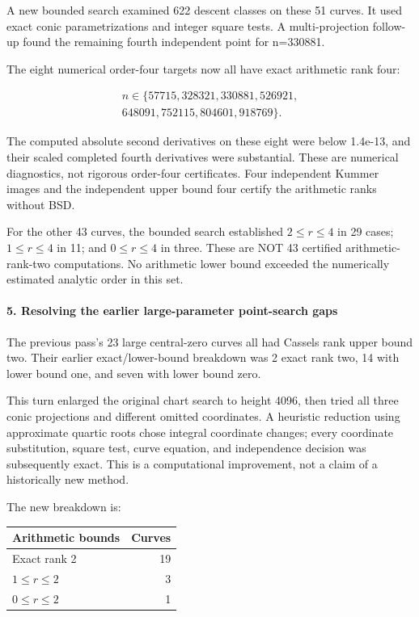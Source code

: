 \documentclass[11pt]{article}
\begin{document}
A new bounded search examined 622 descent classes on these 51 curves. It used exact conic parametrizations and integer square tests. A multi-projection follow-up found the remaining fourth independent point for n=330881.

The eight numerical order-four targets now all have exact arithmetic rank four:

\[
\begin{gathered}
 n\in\{57715,328321,330881,526921,\\
 648091,752115,804601,918769\}.
\end{gathered}
\]

The computed absolute second derivatives on these eight were below 1.4e-13, and their scaled completed fourth derivatives were substantial. These are numerical diagnostics, not rigorous order-four certificates. Four independent Kummer images and the independent upper bound four certify the arithmetic ranks without BSD.

For the other 43 curves, the bounded search established \(2\le r\le4\) in 29 cases; \(1\le r\le4\) in 11; and \(0\le r\le4\) in three. These are NOT 43 certified arithmetic-rank-two computations. No arithmetic lower bound exceeded the numerically estimated analytic order in this set.

\paragraph{5. Resolving the earlier large-parameter point-search gaps}

The previous pass's 23 large central-zero curves all had Cassels rank upper bound two. Their earlier exact/lower-bound breakdown was 2 exact rank two, 14 with lower bound one, and seven with lower bound zero.

This turn enlarged the original chart search to height 4096, then tried all three conic projections and different omitted coordinates. A heuristic reduction using approximate quartic roots chose integral coordinate changes; every coordinate substitution, square test, curve equation, and independence decision was subsequently exact. This is a computational improvement, not a claim of a historically new method.

The new breakdown is:

\begingroup\small\setlength{\tabcolsep}{4pt}
\begin{longtable}[]{@{}lr@{}}
\toprule\noalign{}
Arithmetic bounds & Curves \\
\midrule\noalign{}
\endhead
\bottomrule\noalign{}
\endlastfoot
Exact rank 2 & 19 \\
\(1\le r\le2\) & 3 \\
\(0\le r\le2\) & 1 \\
\end{longtable}
\endgroup
\end{document}
